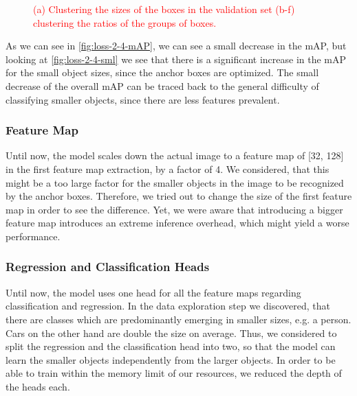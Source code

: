 \documentclass{article}
\begin{document}
\begin{figure}[h!]
    \vspace{-0.15cm}
    \vspace{-0.15cm}
    \caption{\textcolor{red}{(a)  Clustering the sizes of the boxes in the validation set (b-f) clustering the ratios of the groups of boxes.}}
    \label{fig:clustering}
\end{figure}

As we can see in \ref{fig:loss-2-4-mAP}, we can see a small decrease in the mAP, but looking at \ref{fig:loss-2-4-sml} we see that there is a significant increase in the mAP for the small object sizes, since the anchor boxes are optimized. The small decrease of the overall mAP can be traced back to the general difficulty of classifying smaller objects, since there are less features prevalent.

\subsubsection*{Feature Map}

Until now, the model scales down the actual image to a feature map of [32, 128] in the first feature map extraction, by a factor of 4. We considered, that this might be a too large factor for the smaller objects in the image to be recognized by the anchor boxes. Therefore, we tried out to change the size of the first feature map in order to see the difference. Yet, we were aware that introducing a bigger feature map introduces an extreme inference overhead, which might yield a worse performance.

\subsubsection*{Regression and Classification Heads}

Until now, the model uses one head for all the feature maps regarding classification and regression. In the data exploration step we discovered, that there are classes which are predominantly emerging in smaller sizes, e.g. a person. Cars on the other hand are double the size on average. Thus, we considered to split the regression and the classification head into two, so that the model can learn the smaller objects independently from the larger objects. In order to be able to train within the memory limit of our resources, we reduced the depth of the heads each.
\end{document}
